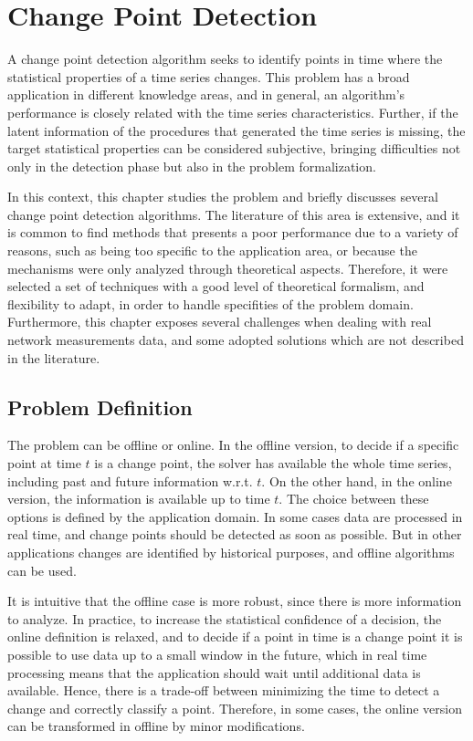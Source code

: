 \chapter{Change Point Detection}
\label{chap:change_point_detection}

A change point detection algorithm seeks to identify points in time where the
statistical properties of a time series changes. This problem has a broad
application in different knowledge areas, and in general, an algorithm's
performance is closely related with the time series characteristics.
Further, if the latent information of the procedures that generated the time
series is missing, the target statistical properties can be considered
subjective, bringing difficulties not only in the detection phase but also in
the problem formalization.

In this context, this chapter studies the problem and briefly discusses
several change point detection algorithms. The literature of this area is
extensive, and it is common to find methods that presents a poor performance
due to a variety of reasons, such as being too specific to the application
area, or because the mechanisms were only analyzed through theoretical
aspects. Therefore, it were selected a set of techniques with a good level
of theoretical formalism, and flexibility to adapt, in order to handle
specifities of the problem domain. Furthermore, this chapter exposes several
challenges when dealing with real network measurements data,
and some adopted solutions which are not described in the literature.

\section{Problem Definition}

The problem can be offline or online. In the offline version, to decide if a
specific point at time $t$ is a change point, the solver has available the
whole time series, including past and future information w.r.t. $t$. On the
other hand, in the online version, the information is available up to time $t$.
The choice between these options is defined by the application domain. In some
cases data are processed in real time, and change points should be detected as
soon as possible. But in other applications changes are identified by historical
purposes, and offline algorithms can be used.

It is intuitive that the offline case is more robust, since there is more
information to analyze. In practice, to increase the statistical confidence of
a decision, the online definition is relaxed, and to decide if a point in time
is a change point it is possible to use data up to a small window in the future,
which in real time processing means that the application should wait until
additional data is available. Hence, there is a trade-off between minimizing
the time to detect a change and correctly classify a point. Therefore, in some
cases, the online version can be transformed in offline by minor modifications.

